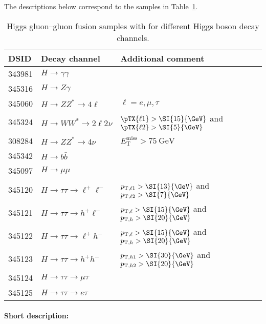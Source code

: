 The descriptions below correspond to the samples in Table~\ref{tab:higgs-ggH-samples}.
\begin{table}[!htbp]
  \caption{\POWHEG Higgs gluon--gluon fusion samples with \POWPY[8] for different Higgs boson decay channels.}%
  \label{tab:higgs-ggH-samples}
  \centering
  \begin{tabular}{ l | l | l}
    \toprule
    DSID   & Decay channel & Additional comment \\
    \midrule
    343981 & $H\to\gamma\gamma$&   \\
    345316 & $H\to Z\gamma$ & \\
    345060 & $H\to ZZ^{*} \to 4\ell $ & $\ell=e,\mu,\tau$   \\
    345324 & $H\to WW^{*} \to 2\ell2\nu $ &  $\pTX{\ell1} > \SI{15}{\GeV}$ and $\pTX{\ell2} > \SI{5}{\GeV}$ \\
    308284 & $H\to ZZ^{*}\to 4\nu$ & $E_\text{T}^\text{miss} > \SI{75}{\GeV}$\\
    345342 & $H\to b \bar{b}$ & \\
    345097 & $H\to\mu\mu$      &     \\
    345120 & $H\to\tau\tau\to \ell^{+}\ell^{-}$      & $p_{{\textrm T},\ell1} > \SI{13}{\GeV}$ and $p_{{\textrm T},\ell2} > \SI{7}{\GeV}$ \\
    345121 & $H\to\tau\tau\to h^{+}\ell^{-}$      & $p_{{\textrm T},\ell} > \SI{15}{\GeV}$ and $p_{{\textrm T},h} > \SI{20}{\GeV}$ \\
    345122 & $H\to\tau\tau\to \ell^{+}h^{-}$      & $p_{{\textrm T},\ell} > \SI{15}{\GeV}$ and $p_{{\textrm T},h} > \SI{20}{\GeV}$ \\
    345123 & $H\to\tau\tau\to h^{+}h^{-}$      & $p_{{\textrm T},h1} > \SI{30}{\GeV}$ and $p_{{\textrm T},h2} > \SI{20}{\GeV}$ \\
    345124 & $H\to\tau\tau\to \mu\tau$      &\\ %
    345125 & $H\to\tau\tau\to e \tau$      & \\ %
    \bottomrule
  \end{tabular}
\end{table}

\paragraph{Short description:}


